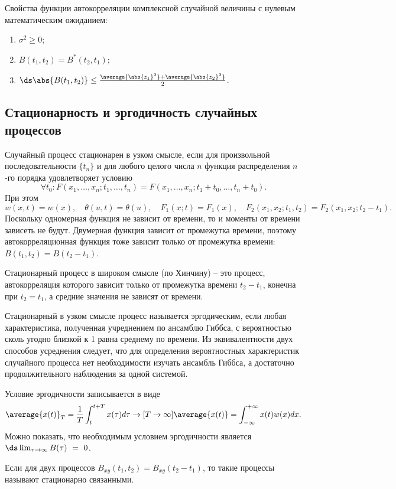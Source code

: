 Свойства функции автокорреляции комплексной случайной величины с нулевым
математическим ожиданием:
\begin{enumerate}
    \item \( \sigma^2 \ge 0 \);
    \item \( B(t_1,t_2) = B^*(t_2,t_1) \);
    \item \( \ds \abs{B(t_1,t_2)} \le \frac{\average{\abs{z_1}^2} +
        \average{\abs{z_2}^2}}{2} \).
\end{enumerate}

\subsection{Стационарность и эргодичность случайных процессов}
Случайный процесс стационарен в узком смысле, если для произвольной
последовательности \( \{t_n\} \) и для любого целого числа \( n \)  функция
распределения \( n \)-го порядка удовлетворяет условию
\[
    \forall t_0:
    F(x_1,\ldots,x_n;t_1,\ldots,t_n) = F(x_1,\ldots,x_n;t_1+t_0,\ldots,t_n+t_0).
\]
При этом
\[
    w(x,t) = w(x),\quad \theta(u,t) = \theta(u),\quad F_1(x;t) = F_1(x),\quad
    F_2(x_1,x_2;t_1,t_2) = F_2(x_1,x_2;t_2-t_1).
\]
Поскольку одномерная функция не зависит от времени, то и моменты от времени
зависеть не будут. Двумерная функция зависит от промежутка времени, поэтому
автокорреляционная функция тоже зависит только от промежутка времени:
\( B(t_1,t_2) = B(t_2-t_1) \).

Стационарный процесс в широком смысле (по Хинчину) -- это процесс,
автокорреляция которого зависит только от промежутка времени \( t_2 - t_1 \),
конечна при \( t_2 = t_1 \), а средние значения не зависят от времени.

Стационарный в узком смысле процесс называется эргодическим, если любая
характеристика, полученная учреднением по ансамблю Гиббса, с вероятностью сколь
угодно близкой к 1 равна среднему по времени. Из эквивалентности двух способов
усреднения следует, что для определения вероятностных характеристик случайного
процесса нет необходимости изучать ансамбль Гиббса, а достаточно
продолжительного наблюдения за одной системой.

Условие эргодичности записывается в виде
\[
    \average{x(t)}_T = \frac{1}{T}\int_t^{t+T} x(\tau)d\tau \to[T\to\infty]
    \average{x(t)} = \int_{-\infty}^{+\infty} x(t)w(x)dx.
\]
Можно показать, что необходимым условием эргодичности является
\(\ds \lim_{\tau\to\infty}B(\tau)~=~0 \).

Если для двух процессов \( B_{xy}(t_1,t_2) = B_{xy}(t_2-t_1) \), то такие
процессы называют стационарно связанными.

